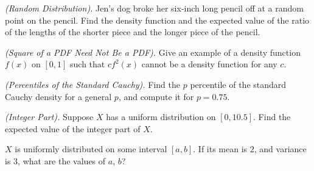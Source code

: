 \begin{problem}[Handout 12, \# 19]
  \emph{(Random Distribution).} Jen's dog broke her six-inch long pencil
  off at a random point on the pencil. Find the density function and the
  expected value of the ratio of the lengths of the shorter piece and the
  longer piece of the pencil.
\end{problem}
\begin{solution}

\end{solution}
\newpage

\begin{problem}[Handout 12, \# 20]
  \emph{(Square of a PDF Need Not Be a PDF).} Give an example of a density
  function \(f(x)\) on \([0,1]\) such that \(cf^2(x)\) cannot be a density
  function for any \(c\).
\end{problem}
\begin{solution}

\end{solution}
\newpage

\begin{problem}[Handout 12, \# 21]
  \emph{(Percentiles of the Standard Cauchy).} Find the \(p\)
  percentile of the standard Cauchy density for a general \(p\), and
  compute it for \(p=0.75\).
\end{problem}
\begin{solution}

\end{solution}
\newpage

\begin{problem}[Handout 12, \# 22]
  \emph{(Integer Part).} Suppose \(X\) has a uniform distribution on
  \([0,10.5]\). Find the expected value of the integer part of \(X\).
\end{problem}
\begin{solution}

\end{solution}
\newpage

\begin{problem}[Handout 12, \# 23]
  \(X\) is uniformly distributed on some interval \([a,b]\). If its mean is
  \(2\), and variance is \(3\), what are the values of \(a\), \(b\)?
\end{problem}
\begin{solution}

\end{solution}

